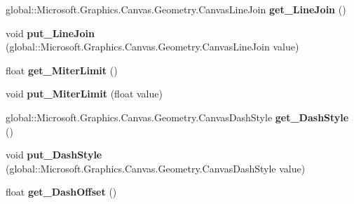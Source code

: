 \begin{DoxyCompactItemize}
global\+::\+Microsoft.\+Graphics.\+Canvas.\+Geometry.\+Canvas\+Line\+Join {\bfseries get\+\_\+\+Line\+Join} ()
\item 
\mbox{\label{class_microsoft_1_1_graphics_1_1_canvas_1_1_geometry_1_1_canvas_stroke_style_a112f794308a583b16c6b52a845430a94}} 
void {\bfseries put\+\_\+\+Line\+Join} (global\+::\+Microsoft.\+Graphics.\+Canvas.\+Geometry.\+Canvas\+Line\+Join value)
\item 
\mbox{\label{class_microsoft_1_1_graphics_1_1_canvas_1_1_geometry_1_1_canvas_stroke_style_a999cba5c52b4a29dc17175ce7f226aec}} 
float {\bfseries get\+\_\+\+Miter\+Limit} ()
\item 
\mbox{\label{class_microsoft_1_1_graphics_1_1_canvas_1_1_geometry_1_1_canvas_stroke_style_ad0733f31456bf9ae960760a481eb54a5}} 
void {\bfseries put\+\_\+\+Miter\+Limit} (float value)
\item 
\mbox{\label{class_microsoft_1_1_graphics_1_1_canvas_1_1_geometry_1_1_canvas_stroke_style_ab7a77fa7925c62bfceb8ec4a9ffed0a2}} 
global\+::\+Microsoft.\+Graphics.\+Canvas.\+Geometry.\+Canvas\+Dash\+Style {\bfseries get\+\_\+\+Dash\+Style} ()
\item 
\mbox{\label{class_microsoft_1_1_graphics_1_1_canvas_1_1_geometry_1_1_canvas_stroke_style_a58b2ea381cdec6b425c64655ffe06924}} 
void {\bfseries put\+\_\+\+Dash\+Style} (global\+::\+Microsoft.\+Graphics.\+Canvas.\+Geometry.\+Canvas\+Dash\+Style value)
\item 
\mbox{\label{class_microsoft_1_1_graphics_1_1_canvas_1_1_geometry_1_1_canvas_stroke_style_ad6a5cdd86562a8dfdb8e856ccf7227dc}} 
float {\bfseries get\+\_\+\+Dash\+Offset} ()
\item 
\mbox{\label{class_microsoft_1_1_graphics_1_1_canvas_1_1_geometry_1_1_canvas_stroke_style_a01c2250f29f3c8b71ac14ac77e246dff}} 

\end{DoxyCompactItemize}
